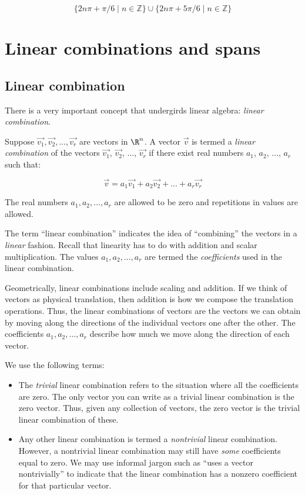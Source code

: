 \documentclass[10pt]{amsart}
\begin{document}
$$\{ 2n\pi + \pi/6 \mid n \in \mathbb{Z} \} \cup \{ 2n\pi + 5\pi/6 \mid n \in \mathbb{Z}\}$$

\section{Linear combinations and spans}

\subsection{Linear combination}

There is a very important concept that undergirds linear algebra: {\em
  linear combination}.

Suppose $\vec{v_1},\vec{v_2},\dots,\vec{v_r}$ are vectors in $\R^n$. A
vector $\vec{v}$ is termed a {\em linear combination} of the vectors
$\vec{v_1}$, $\vec{v_2}$, $\dots$, $\vec{v_r}$ if there exist real
numbers $a_1$, $a_2$, $\dots$, $a_r$ such that:

$$\vec{v} = a_1\vec{v_1} + a_2\vec{v_2} + \dots + a_r\vec{v_r}$$

The real numbers $a_1,a_2,\dots,a_r$ are allowed to be zero and
repetitions in values are allowed.

The term ``linear combination'' indicates the idea of ``combining''
the vectors in a {\em linear} fashion. Recall that linearity has to do
with addition and scalar multiplication. The values
$a_1,a_2,\dots,a_r$ are termed the {\em coefficients} used in the
linear combination.

Geometrically, linear combinations include scaling and addition. If we
think of vectors as physical translation, then addition is how we
compose the translation operations. Thus, the linear combinations of
vectors are the vectors we can obtain by moving along the directions
of the individual vectors one after the other. The coefficients
$a_1,a_2,\dots,a_r$ describe how much we move along the direction of
each vector.

We use the following terms:

\begin{itemize}
\item The {\em trivial} linear combination refers to the situation
  where all the coefficients are zero. The only vector you can write
  as a trivial linear combination is the zero vector. Thus, given any
  collection of vectors, the zero vector is the trivial linear
  combination of these.
\item Any other linear combination is termed a {\em nontrivial} linear
  combination. However, a nontrivial linear combination may still have
  {\em some} coefficients equal to zero. We may use informal jargon
  such as ``uses a vector nontrivially'' to indicate that the linear
  combination has a nonzero coefficient for that particular vector.
\end{itemize}
\end{document}
